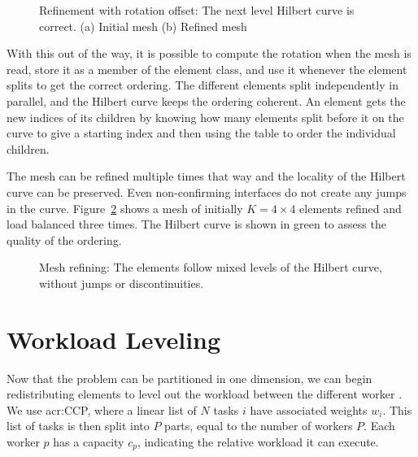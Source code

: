 \begin{figure}[H]
	\centering
	\hfill
	\caption{Refinement with rotation offset: The next level Hilbert curve is correct. (a) Initial mesh (b) Refined mesh}\label{fig:hilbert_correct}
\end{figure}

With this out of the way, it is possible to compute the rotation when the mesh is read, store it as
a member of the element class, and use it whenever the element splits to get the correct ordering.
The different elements split independently in parallel, and the Hilbert curve keeps the ordering
coherent. An element gets the new indices of its children by knowing how many elements split before
it on the curve to give a starting index and then using the table to order the individual children.

The mesh can be refined multiple times that way and the locality of the Hilbert curve can be
preserved. Even non-confirming interfaces do not create any jumps in the curve.
Figure~\ref{fig:mesh_1_after2} shows a mesh of initially \(K = 4 \times 4\) elements refined and
load balanced three times. The Hilbert curve is shown in green to assess the quality of the
ordering.

\begin{figure}[H]
	\centering
	
	\caption{Mesh refining: The elements follow mixed levels of the Hilbert curve, without jumps or discontinuities.}\label{fig:mesh_1_after2}
\end{figure}

\section{Workload Leveling}\label{section:load_balancing:workload_leveling}

Now that the problem can be partitioned in one dimension, we can begin redistributing elements to
level out the workload between the different worker . We use \acrlong{acr:CCP},
where a linear list of \(N\) tasks \(i\) have associated weights \(w_i\). This list of tasks is then
split into \(P\) parts, equal to the number of workers \(P\). Each worker \(p\) has a capacity
\(c_p\), indicating the relative workload it can execute.

